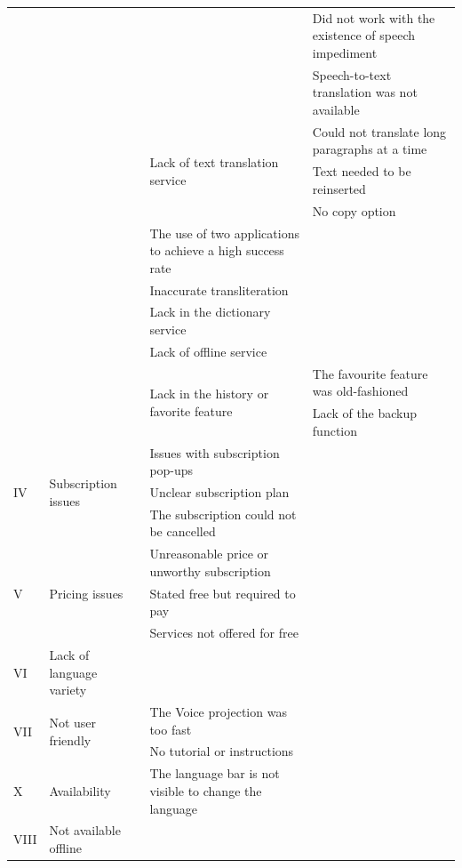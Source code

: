 \documentclass[english]{textolivre}
\begin{document}
\begin{longtable}{p{1cm} p{2.5cm} p{4.5cm} p{5cm}}
& & & Did not work with the existence of speech impediment \\
& & & Speech-to-text translation was not available \\
\cmidrule{3-4}
& & \multirow{3}{=}{Lack of text translation service} & Could not translate long paragraphs at a time \\
& & & Text needed to be reinserted \\
& & & No copy option \\
\cmidrule{3-4}
& & The use of two applications to achieve a high success rate & \cellcolor[HTML]{EFEFEF} \\
\cmidrule{3-4}
& & Inaccurate transliteration & \cellcolor[HTML]{EFEFEF} \\
\cmidrule{3-4}
& & Lack in the dictionary service & \cellcolor[HTML]{EFEFEF} \\
\cmidrule{3-4}
& & Lack of offline service & \cellcolor[HTML]{EFEFEF} \\
\cmidrule{3-4}
& & \multirow{2}{=}{Lack in the history or favorite feature} & The favourite feature was old-fashioned \\
& & & Lack of the backup function \\
\midrule
\multirow{3}{=}{IV} & \multirow{3}{=}{Subscription issues} & Issues with subscription pop-ups & \cellcolor[HTML]{EFEFEF} \\
& & Unclear subscription plan & \cellcolor[HTML]{EFEFEF} \\
& & The subscription could not be cancelled & \cellcolor[HTML]{EFEFEF} \\
\midrule
\multirow{3}{=}{V} & \multirow{3}{=}{Pricing issues} & Unreasonable price or unworthy subscription & \cellcolor[HTML]{EFEFEF} \\
& & Stated free but required to pay & \cellcolor[HTML]{EFEFEF} \\
& & Services not offered for free & \cellcolor[HTML]{EFEFEF} \\
\midrule
VI & Lack of language variety & \cellcolor[HTML]{EFEFEF} & \cellcolor[HTML]{EFEFEF} \\
\midrule
\multirow{2}{=}{VII} & \multirow{2}{=}{Not user friendly} & The Voice projection was too fast & \cellcolor[HTML]{EFEFEF} \\ 
\cmidrule{3-4}
& & No tutorial or instructions & \cellcolor[HTML]{EFEFEF} \\
\midrule
X & Availability & The language bar is not visible to change the language & \cellcolor[HTML]{EFEFEF} \\
\midrule
VIII & Not available offline & \cellcolor[HTML]{EFEFEF} & \cellcolor[HTML]{EFEFEF} \\

\end{longtable}
\end{document}
